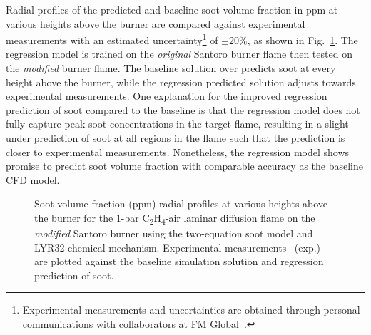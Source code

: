 \documentclass[12pt]{CHT-20}
\begin{document}
Radial profiles of the predicted and baseline soot volume fraction in ppm at various heights above the burner are compared against experimental measurements with an estimated uncertainty\footnote{Experimental measurements and uncertainties are obtained through personal communications with collaborators at FM Global~\citep[]{fmGlobal}.} of $\pm20\%$, as shown in Fig.~\ref{fig:soot_linePlot}. The regression model is trained on the \emph{original} Santoro burner flame then tested on the \emph{modified} burner flame. The baseline solution over predicts soot at every height above the burner, while the regression predicted solution adjusts towards experimental measurements. One explanation for the improved regression prediction of soot compared to the baseline is that the regression model does not fully capture peak soot concentrations in the target flame, resulting in a slight under prediction of soot at all regions in the flame such that the prediction is closer to experimental measurements. Nonetheless, the regression model shows promise to predict soot volume fraction with comparable accuracy as the baseline CFD model. 

\begin{figure}[!ht]
\begin{center}
\end{center}
\caption{Soot volume fraction (ppm) radial profiles at various heights above the burner for the 1-bar C\textsubscript{2}H\textsubscript{4}-air laminar diffusion flame on the \emph{modified} Santoro burner using
the two-equation soot model and LYR32 chemical mechanism. Experimental measurements~\citep[]{fmGlobal} (exp.) are plotted against the baseline simulation solution and regression prediction of soot.}
\label{fig:soot_linePlot}
\end{figure}
\end{document}
